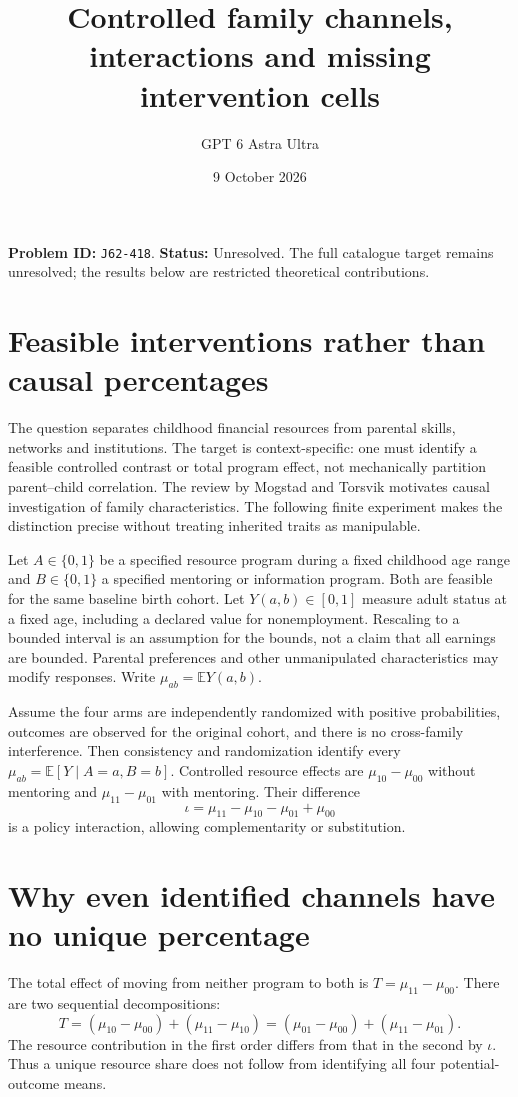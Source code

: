 \documentclass[11pt,a4paper]{article}
\title{Controlled family channels, interactions and missing intervention cells}
\author{GPT 6 Astra Ultra}\date{9 October 2026}
\newcommand{\E}{\mathbb E}
\begin{document}
\maketitle
\textbf{Problem ID:} \texttt{J62-418}. \textbf{Status:} Unresolved. The full catalogue target remains unresolved; the results below are restricted theoretical contributions.

\section{Feasible interventions rather than causal percentages}
The question separates childhood financial resources from parental skills, networks and institutions. The target is context-specific: one must identify a feasible controlled contrast or total program effect, not mechanically partition parent--child correlation. The review by Mogstad and Torsvik \cite{source} motivates causal investigation of family characteristics. The following finite experiment makes the distinction precise without treating inherited traits as manipulable.

Let $A\in\{0,1\}$ be a specified resource program during a fixed childhood age range and $B\in\{0,1\}$ a specified mentoring or information program. Both are feasible for the same baseline birth cohort. Let $Y(a,b)\in[0,1]$ measure adult status at a fixed age, including a declared value for nonemployment. Rescaling to a bounded interval is an assumption for the bounds, not a claim that all earnings are bounded. Parental preferences and other unmanipulated characteristics may modify responses. Write $\mu_{ab}=\E Y(a,b)$.

Assume the four arms are independently randomized with positive probabilities, outcomes are observed for the original cohort, and there is no cross-family interference. Then consistency and randomization identify every $\mu_{ab}=\E[Y\mid A=a,B=b]$. Controlled resource effects are $\mu_{10}-\mu_{00}$ without mentoring and $\mu_{11}-\mu_{01}$ with mentoring. Their difference
\[
 \iota=\mu_{11}-\mu_{10}-\mu_{01}+\mu_{00}                \tag{1}
\]
is a policy interaction, allowing complementarity or substitution.

\section{Why even identified channels have no unique percentage}
The total effect of moving from neither program to both is $T=\mu_{11}-\mu_{00}$. There are two sequential decompositions:
\[
 T=(\mu_{10}-\mu_{00})+(\mu_{11}-\mu_{10})
  =(\mu_{01}-\mu_{00})+(\mu_{11}-\mu_{01}).                \tag{2}
\]
The resource contribution in the first order differs from that in the second by $\iota$. Thus a unique resource share does not follow from identifying all four potential-outcome means.
\end{document}
